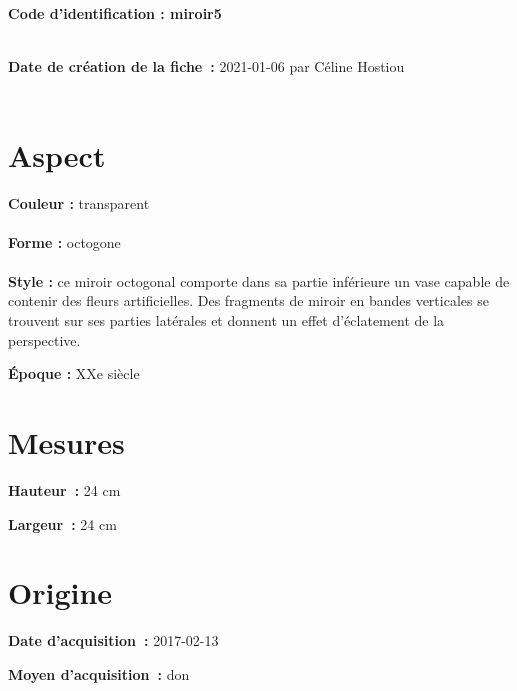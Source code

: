 
    
    
    {\bf \huge Code d’identification : miroir5}
    \\ \\ \hr
    \begin{center}
    \end{center}
    
    {\bf \large Date de création de la fiche :} 2021-01-06
    {par Céline Hostiou}
   \\ \\ \hr
    \section* {Aspect}
   {\bf \large Couleur :} transparent
    \\ \\ {\bf \large Forme :}  octogone
    \\ \\ {\bf \large Style :} 
            ce miroir octogonal comporte dans sa partie inférieure un vase
            capable de contenir des fleurs artificielles. Des fragments de miroir en bandes
            verticales se trouvent sur ses parties latérales et donnent un effet d’éclatement de la
            perspective.
        
        {\bf \large Époque :} XXe siècle
    \section* {Mesures}
      
  {\bf \large Hauteur :} 24 cm
   
   {\bf \large Largeur :} 24 cm
     
    \section* {Origine}
    {\bf \large Date d’acquisition :} 2017-02-13

    {\bf \large Moyen d’acquisition :} don
    
  